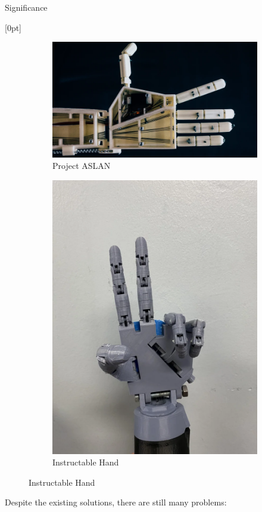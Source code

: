 \documentclass[final, 16pt]{beamer}
\newlength{\colwidth}
\newlength{\twocolwidth}
\begin{document}
\begin{frame}[t]
\begin{columns}[t]
\begin{column}{\twocolwidth}
  \begin{block}{Significance}
    \begin{minipage}[t]{0.48\linewidth}
      [0pt]
    \begin{figure}[ht]
      \centering
      \begin{subfigure}[b]{0.38\linewidth}
        \centering
        \includegraphics[width=\linewidth]{images/aslan.png}
        \caption{Project ASLAN}
        \label{fig:aslan}
      \end{subfigure}
      \begin{subfigure}[b]{0.38\linewidth}
        \centering
        \includegraphics[width=0.425\linewidth]{images/instructable-hand.png}
        \caption{Instructable Hand}
        \label{fig:instructable-hand}
      \end{subfigure}
    \end{figure}
    \vspace{-1em}
    
    Despite the existing solutions, there are still many problems:
    

\end{minipage}
\end{block}
\end{column}
\end{columns}
\end{frame}
\end{document}
